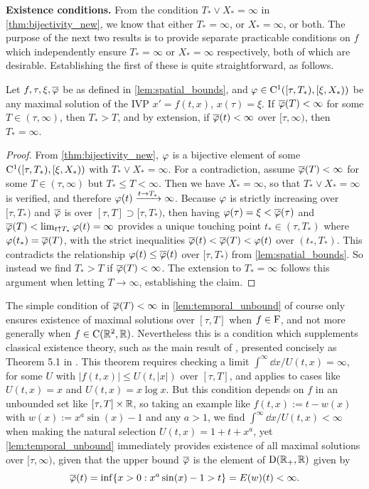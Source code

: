 \vspace{3mm}\textbf{Existence conditions.} From the condition $T_*\vee X_*=\infty$ in \autoref{thm:bijectivity_new}, we know that either $T_*=\infty$, or $X_*=\infty$, or both. The purpose of the next two results is to provide separate practicable conditions on $f$ which independently ensure $T_*=\infty$ or $X_*=\infty$ respectively, both of which are desirable. Establishing the first of these is quite straightforward, as follows.

\begin{lemma}\label{lem:temporal_unbound}
    Let $f,\tau,\xi,\overline{\varphi}$ be as defined in \autoref{lem:spatial_bounds}, and $\varphi\in\mathrm{C}^1([\tau,T_*),[\xi,X_*))$ be any maximal solution  of the IVP $x'=f(t,x)$, $x(\tau)=\xi$. If $\overline{\varphi}(T)<\infty$ for some $T\in(\tau,\infty)$, then $T_*>T$, and by extension, if $\overline{\varphi}(t)<\infty$ over $[\tau,\infty)$, then $T_*=\infty$.
\end{lemma}
\begin{proof}
    From \autoref{thm:bijectivity_new}, $\varphi$ is a bijective element of some $\mathrm{C}^1([\tau,T_*),[\xi,X_*))$ with $T_*\vee X_*=\infty$. For a contradiction, assume $\overline{\varphi}(T)<\infty$ for some $T\in(\tau,\infty)$ but $T_*\le T<\infty$. Then we have $X_*=\infty$, so that $T_*\vee X_*=\infty$ is verified, and therefore $\varphi(t)\xrightarrow{t\to T_*}\infty$. Because $\varphi$ is strictly increasing over $[\tau,T_*)$ and $\overline{\varphi}$ is over $[\tau,T]\supset[\tau,T_*)$, then having $\varphi(\tau)=\xi<\overline{\varphi}(\tau)$ and $\overline{\varphi}(T)<\lim_{t\uparrow T_*}\varphi(t)=\infty$ provides a unique touching point $t_*\in(\tau,T_*)$ where $\varphi(t_*)=\overline{\varphi}(T)$, with the strict inequalities $\overline{\varphi}(t)<\overline{\varphi}(T)<\varphi(t)$ over $(t_*,T_*)$. This contradicts the relationship $\varphi(t)\le\overline{\varphi}(t)$ over $[\tau,T_*)$ from \autoref{lem:spatial_bounds}. So instead we find $T_*>T$ if $\overline{\varphi}(T)<\infty$. The extension to $T_*=\infty$ follows this argument when letting $T\to\infty$, establishing the claim.
\end{proof}

The simple condition of $\overline{\varphi}(T)<\infty$ in \autoref{lem:temporal_unbound} of course only ensures existence of maximal solutions over $[\tau,T]$ when $f\in\mathrm{F}$, and not more generally when $f\in\mathrm{C}(\mathbb{R}^2,\mathbb{R})$. Nevertheless this is a condition which supplements classical existence theory, such as the main result of \cite{wintner_1945}, presented concisely as Theorem 5.1 in \cite{hartman_2002}. This theorem requires checking a limit $\int^\infty\dd x/U(t,x)=\infty$, for some $U$ with $|f(t,x)|\le U(t,|x|)$ over $[\tau,T]$, and applies to cases like $U(t,x)=x$ and $U(t,x)=x\log x$. But this condition depends on $f$ in an unbounded set like $[\tau,T]\times\mathbb{R}$, so taking an example like $f(t,x):=t-w(x)$ with $w(x):=x^a\sin(x) - 1$ and any $a>1$, we find $\int^\infty\dd x/U(t,x)<\infty$ when making the natural selection $U(t,x)=1+t+x^a$, yet \autoref{lem:temporal_unbound} immediately provides existence of all maximal solutions over $[\tau,\infty)$, given that the upper bound $\overline{\varphi}$ is the element of $\mathrm{D}(\mathbb{R}_+,\mathbb{R})$ given by
\begin{equation}\label{eq:exit_use1}
    \overline{\varphi}(t) = \inf\{x>0: x^a\sin(x)-1>t\} = E(w)(t) < \infty.
\end{equation}

